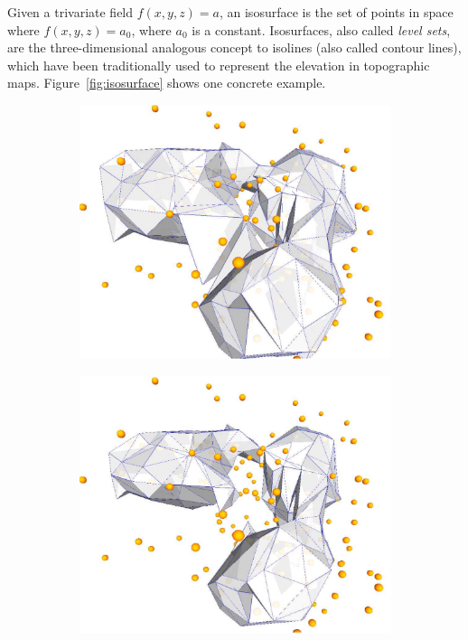 Given a trivariate field $f(x,y,z) = a$, an isosurface is the set of points in space where $f(x,y,z) = a_0$, where $a_0$ is a constant. 
Isosurfaces, also called \emph{level sets}, 
are the three-dimensional analogous concept to isolines (also called contour lines), which have been traditionally used to represent the elevation in topographic maps.
Figure~\ref{fig:isosurface} shows one concrete example.
\begin{figure}
  \centering
  \begin{subfigure}[b]{0.28\linewidth}
    \centering
    \includegraphics[width=\textwidth]{figs/isosurface2}
    \caption{}
  \end{subfigure}%
  \qquad
  \begin{subfigure}[b]{0.28\linewidth}
    \centering
    \includegraphics[width=\textwidth]{figs/isosurface25}

\end{subfigure}
\end{figure}
